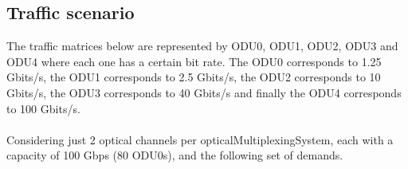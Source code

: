 \subsection{Traffic scenario}
The traffic matrices below are represented by ODU0, ODU1, ODU2, ODU3 and ODU4 where each one has a certain bit rate. The ODU0 corresponds to 1.25 Gbits/s, the ODU1 corresponds to 2.5 Gbits/s, the ODU2 corresponds to 10 Gbits/s, the ODU3 corresponds to 40 Gbits/s and finally the ODU4 corresponds to 100 Gbits/s.\\ \\
Considering just 2 optical channels per opticalMultiplexingSystem, each with a capacity of 100 Gbps (80 ODU0s), and the following set of demands.\\ \\

